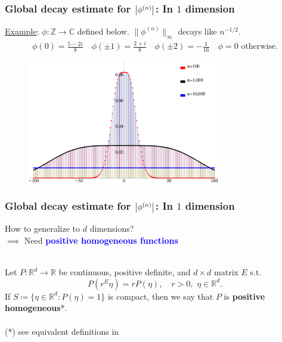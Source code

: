 \documentclass{beamer}
\theoremstyle{definition}
\begin{document}
\begin{frame}
\frametitle{Global decay estimate for $\abs{\phi^{(n)}}$: In $1$ dimension}

\underline{Example}: $\phi:\mathbb{Z} \to \mathbb{C}$ defined below. $\| \phi^{(n)} \|_\infty$ decays like $n^{-1/2}$.
\begin{align*}
\phi(0) = \frac{5-2i}{8} \quad \phi(\pm 1) = \frac{2+i}{8} \quad \phi(\pm 2) = -\frac{1}{16} \quad \phi = 0 \text{ otherwise.}
\end{align*}

\begin{figure}
	\vspace{-10pt}
	\centering
	\includegraphics[width=0.75\textwidth]{ex1abs.eps}
\end{figure}

\end{frame}




\begin{frame}
\frametitle{Global decay estimate for $\abs{\phi^{(n)}}$: In $1$ dimension}

How to generalize to $d$ dimensions?\\ $\implies$ Need \textbf{\textcolor{blue}{positive homogeneous functions}}\\
$\,$\\
\begin{definition}
	Let $P:\mathbb{R}^d\to\mathbb{R}$ be continuous, positive definite, and $d\times d$ matrix $E$ s.t. $$P(r^E \eta) = rP(\eta), \quad r>0,\,\,\eta\in\mathbb{R}^d.$$ If $S \coloneqq \{ \eta \in \mathbb{R}^d : P(\eta) = 1 \}$ is compact, then we say that $P$ is\textbf{ positive homogeneous}*.\\
	$\,$\\
	
	\scriptsize{(*) see equivalent definitions in \cite{bui2021generalized}}
\end{definition}


\end{frame}
\end{document}
